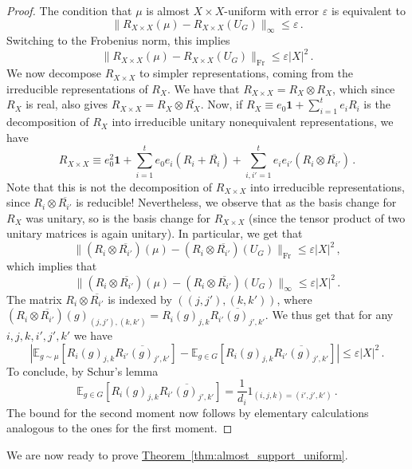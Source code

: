 \documentclass[10pt]{article}
\theoremstyle{definition}
\numberwithin{equation}{section}
\newcommand{\expref}[2]{\texorpdfstring{\hyperref[#2]{#1~\ref{#2}}}{#1~\ref{#2}}}
\def\E{\mathbb{E}}
\def\eps{\varepsilon}
\def\one{\mathbf{1}}
\def\Fr{\textrm{Fr}}
\begin{document}
\begin{proof}
The condition that $\mu$ is
almost $X \times X$-uniform with error $\eps$ is equivalent to
$$
\|R_{X \times X}(\mu) - R_{X \times X}(U_G)\|_{\infty} \le \eps\,.
$$
Switching to the Frobenius norm, this implies
$$
\|R_{X \times X}(\mu) - R_{X \times X}(U_G)\|_{\Fr} \le \eps |X|^2\,.
$$
We now decompose $R_{X \times X}$ to simpler representations, coming
from the irreducible representations of $R_X$. We have that $R_{X
\times X}=R_X \otimes R_X$, which since $R_X$ is real, also gives $R_{X
\times X} = R_X \otimes \overline{R_X}$.  Now, if $R_X \equiv e_0 \one
+ \sum_{i=1}^t e_i R_i$ is the decomposition of $R_X$ into irreducible
unitary nonequivalent representations, we have $$ R_{X \times X} \equiv
e_0^2 \one + \sum_{i=1}^t e_0 e_i (R_i+\overline{R_i}) + \sum_{i,i'=1}^{t}
e_i e_{i'} (R_{i} \otimes \overline{R_{i'}})\,.$$ Note that this is not
the decomposition of $R_{X \times X}$ into irreducible representations,
since $R_i \otimes \overline{R_{i'}}$ is reducible! Nevertheless, we
observe that as the basis change for $R_X$ was unitary, so is the basis
change for $R_{X \times X}$ (since the tensor product of two unitary
matrices is again unitary). In particular, we get that 
\[
\|(R_i \otimes
\overline{R_{i'}})(\mu) - (R_i \otimes \overline{R_{i'}})(U_G)\|_{\Fr}
\le \eps |X|^2\,,
\]
which implies that
$$
\|(R_i \otimes \overline{R_{i'}})(\mu) -
(R_i \otimes \overline{R_{i'}})(U_G)\|_{\infty} \le \eps |X|^2\,.
$$
The matrix $R_i \otimes \overline{R_{i'}}$ is
indexed by $((j,j'),(k,k'))$, where $(R_i \otimes
\overline{R_{i'}})(g)_{(j,j'),(k,k')} = R_i(g)_{j,k}
\overline{R_{i'}(g)_{j',k'}}$. We thus get that for any $i,j,k,i',j',k'$
we have
$$
\left| \E_{g \sim \mu}[R_i(g)_{j,k} \overline{R_{i'}(g)_{j',k'}}]
- \E_{g \in G}[R_i(g)_{j,k} \overline{R_{i'}(g)_{j',k'}}]
\right| \le \eps |X|^2\,.
$$
To conclude, by Schur's lemma
$$
\E_{g \in G}[R_i(g)_{j,k} \overline{R_{i'}(g)_{j',k'}}]
= \frac{1}{d_i} 1_{(i,j,k)=(i',j',k')}\,.
$$
The bound for the second moment now follows by
elementary calculations analogous to the ones for the first moment.
\end{proof}

We are now ready to prove \expref{Theorem}{thm:almost_support_uniform}.
\end{document}
